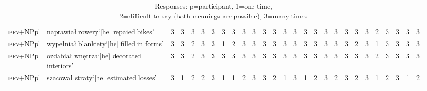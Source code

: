 \documentclass[output=paper]{langscibook}
\begin{document}
\begin{paperappendix}
\begin{sidewaystable}
{\begin{tabular}{l>{\raggedright}p{5cm}rrrrrrrrrrrrrrrrrrrrrrrrr}
\textsc{ipfv}+NPpl&naprawiał rowery\newline  `[he] repaied bikes'&3&3&3&3&3&3&3&3&3&3&3&3&3&3&3&3&3&3&3&3&2&3&3&3&3\\
\textsc{ipfv}+NPpl&wypełniał blankiety\newline  `[he] filled in forms'&3&3&2&3&3&1&2&3&3&3&3&3&3&3&3&3&3&3&2&3&1&3&3&3&3\\
\textsc{ipfv}+NPpl&ozdabiał wnętrza\newline  `[he] decorated interiors'&3&3&2&3&3&3&3&3&3&3&3&3&3&3&3&3&3&3&3&3&2&3&3&3&3\\
\textsc{ipfv}+NPpl&szacował straty\newline  `[he] estimated losses'&3&1&2&2&3&1&1&2&3&3&2&1&3&1&2&3&2&3&2&3&1&2&3&1&2\\
\lspbottomrule
    \end{tabular}
    }
    \caption{Responses: p=participant, 1=one time,\\ 2=difficult to say (both meanings are possible), 3=many times}
    \label{jan-bla:fansb:kb:tab4}
\end{sidewaystable}
\end{paperappendix}

{\sloppy\printbibliography[heading=subbibliography,notkeyword=this]}
\end{document}
